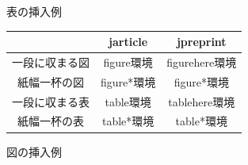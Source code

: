 \documentclass{jabstract}
\begin{document}
\begin{multicols}{2}
\begin{tablehere}
  \noindent
  \parbox{\linewidth}{
    \centering
    \caption{表の挿入例}\label{tab:sample}
    \begin{tabular}{|c|c|c|}
      \hline
      & jarticle & jpreprint\\
      \hline
      一段に収まる図 & figure環境 & figurehere環境\\
      \hline
      紙幅一杯の図 & figure*環境 & figure*環境\\
      \hline
      一段に収まる表 & table環境 & tablehere環境\\
      \hline
      紙幅一杯の表 & table*環境 & table*環境\\
      \hline
    \end{tabular}
  }%
\end{tablehere}

\begin{figurehere}
  \noindent
  \parbox{\linewidth}{
    \centering
    \caption{図の挿入例}\label{fig:sample}
  }%
\end{figurehere}


\end{multicols}
\end{document}

